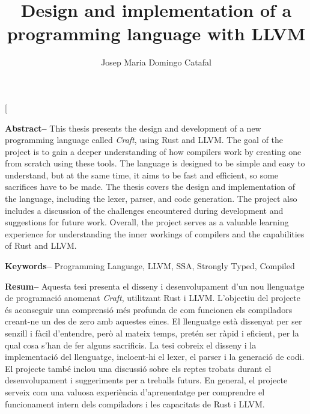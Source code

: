 ﻿\documentclass[10pt,a4paper,twocolumn,twoside]{article}
\author{\LARGE\sffamily Josep Maria Domingo Catafal}
\title{\Huge{\sffamily  Design and implementation of a programming language with LLVM }}
\date{}
\begin{document}
\fancyhead[RO]{\thepage}
\fancyhead[LE]{\thepage}

\fancyfoot[CO,CE]{}

{
   \fancyhf{}
}

\renewcommand{\headrulewidth}{0pt}
\renewcommand{\footrulewidth}{0pt}
\pagestyle{fancy}

\twocolumn[\begin{@twocolumnfalse}

\maketitle

\thispagestyle{primerapagina}

\begin{center}
\parbox{0.915\textwidth}
{\sffamily

    \textbf{Abstract--} This thesis presents the design and development of a new
    programming language called \textit{Craft}, using Rust and LLVM. The goal of
    the project is to gain a deeper understanding of how compilers work by
    creating one from scratch using these tools. The language is designed to be
    simple and easy to understand, but at the same time, it aims to be fast and
    efficient, so some sacrifices have to be made. The thesis covers the design
    and implementation of the language, including the lexer, parser, and code
    generation. The project also includes a discussion of the challenges
    encountered during development and suggestions for future work. Overall, the
    project serves as a valuable learning experience for understanding the inner
    workings of compilers and the capabilities of Rust and LLVM.

    \bigskip

    \textbf{Keywords-- } Programming Language, LLVM, SSA, Strongly Typed, Compiled

    \bigskip

    \textbf{Resum--} Aquesta tesi presenta el disseny i desenvolupament d'un nou
    llenguatge de programació anomenat \textit{Craft}, utilitzant Rust i LLVM.
    L'objectiu del projecte és aconseguir una comprensió més profunda de com
    funcionen els compiladors creant-ne un des de zero amb aquestes eines. El
    llenguatge està dissenyat per ser senzill i fàcil d'entendre, però al mateix
    temps, pretén ser ràpid i eficient, per la qual cosa s'han de fer alguns
    sacrificis. La tesi cobreix el disseny i la implementació del llenguatge,
    incloent-hi el lexer, el parser i la generació de codi. El projecte també
    inclou una discussió sobre els reptes trobats durant el desenvolupament i
    suggeriments per a treballs futurs. En general, el projecte serveix com una
    valuosa experiència d'aprenentatge per comprendre el funcionament intern
    dels compiladors i les capacitats de Rust i LLVM.

}
\end{center}
\end{@twocolumnfalse}
\end{document}

